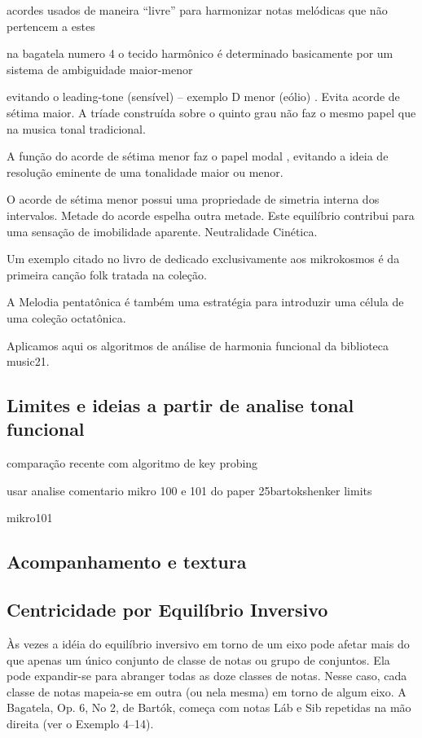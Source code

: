 \documentclass[
	12pt,				%
	openright,			%
	twoside,			%
	a4paper,			%
	english,			%
	french,				%
	spanish,			%
	brazil				%
	]{abntex2}
\begin{document}
acordes usados de maneira “livre” para harmonizar notas melódicas que não pertencem a estes

na bagatela numero 4 o tecido harmônico é determinado basicamente por um sistema de ambiguidade maior-menor 

evitando o leading-tone (sensível) – exemplo D menor (eólio) . Evita acorde de sétima maior. 
A tríade construída sobre o quinto grau não faz o mesmo papel que na musica tonal tradicional.

A função do acorde de sétima menor faz o papel modal , evitando a ideia de resolução eminente de uma tonalidade maior ou menor.

O acorde de sétima menor possui uma propriedade de simetria interna dos intervalos. Metade do acorde espelha outra metade. Este equilíbrio contribui para uma sensação de imobilidade aparente. Neutralidade Cinética.



Um exemplo citado no livro de   dedicado exclusivamente aos mikrokosmos é da primeira canção folk tratada na coleção.

A Melodia pentatônica é também uma estratégia para introduzir uma célula de uma coleção octatônica.

Aplicamos aqui os algoritmos de análise de harmonia funcional da biblioteca music21.

\subsection{Limites e ideias a partir de analise tonal funcional}

comparação recente com algoritmo de key probing
\cite{cooper1998unfolding}


usar analise comentario mikro 100 e 101 do paper 25bartokshenker limits
\cite[ p.179]{brown1997iv}

mikro101
\cite[ p.113]{straus2004}

\subsection{Acompanhamento e textura}

\cite{starr1985melody}


\subsection{Centricidade por Equilíbrio Inversivo}
Às vezes a idéia do equilíbrio inversivo em torno de um eixo pode afetar mais do que
apenas um único conjunto de classe de notas ou grupo de conjuntos. Ela pode expandir-se
para abranger todas as doze classes de notas. Nesse caso, cada classe de notas mapeia-se
em outra (ou nela mesma) em torno de algum eixo. A Bagatela, Op. 6, No 2, de Bartók,
começa com notas Láb e Sib repetidas na mão direita (ver o Exemplo 4–14).
\end{document}
